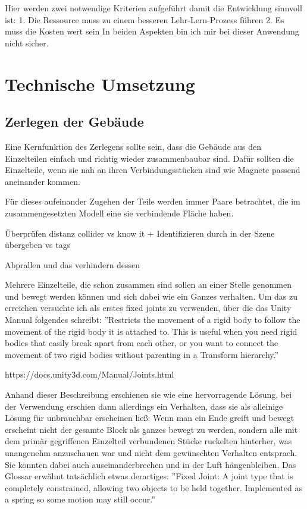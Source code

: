 \documentclass[11pt]{article} %
\begin{document}
Hier werden zwei notwendige Kriterien aufgeführt damit die Entwicklung sinnvoll ist:
1. Die Ressource muss zu einem besseren Lehr-Lern-Prozess führen
2. Es muss die Kosten wert sein 
In beiden Aspekten bin ich mir bei dieser Anwendung nicht sicher.

\section{Technische Umsetzung}

\subsection{Zerlegen der Gebäude}

Eine Kernfunktion des Zerlegens sollte sein, dass die Gebäude aus den Einzelteilen einfach und richtig wieder zusammenbaubar sind. Dafür sollten die Einzelteile, wenn sie nah an ihren Verbindungsstücken sind wie Magnete passend aneinander kommen.

Für dieses aufeinander Zugehen der Teile werden immer Paare betrachtet, die im zusammengesetzten Modell eine sie verbindende Fläche haben. 

Überprüfen distanz collider vs know it  +  Identifizieren durch in der Szene übergeben vs tags 

Abprallen und das verhindern dessen

Mehrere Einzelteile, die schon zusammen sind sollen an einer Stelle genommen und bewegt werden können und sich dabei wie ein Ganzes verhalten.
Um das zu erreichen versuchte ich als erstes fixed joints zu verwenden, über die das Unity Manual folgendes schreibt: 
''Restricts the movement of a rigid body to follow the movement of the rigid body it is attached to. This is useful when you need rigid bodies that easily break apart from each other, or you want to connect the movement of two rigid bodies without parenting in a Transform hierarchy.'' 

https://docs.unity3d.com/Manual/Joints.html

Anhand dieser Beschreibung erschienen sie wie eine hervorragende Lösung, bei der Verwendung erschien dann allerdings ein Verhalten, dass sie als alleinige Lösung für unbrauchbar erscheinen ließ: Wenn man ein Ende greift und bewegt erscheint nicht der gesamte Block als ganzes bewegt zu werden, sondern alle mit dem primär gegriffenen Einzelteil verbundenen Stücke ruckelten hinterher, was unangenehm anzuschauen war und nicht dem gewünschten Verhalten entsprach.
Sie konnten dabei auch auseinanderbrechen und in der Luft hängenbleiben.
Das Glossar erwähnt tatsächlich etwas derartiges: \newline
''Fixed Joint: A joint type that is completely constrained, allowing two objects to be held together. Implemented as a spring so some motion may still occur.'' \newline
\end{document}
